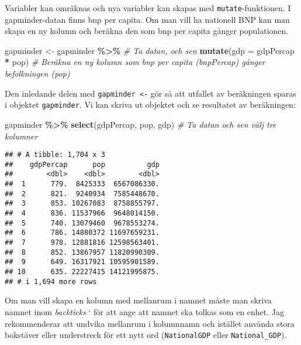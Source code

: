 \documentclass[
]{book}
\newenvironment{Shaded}{\begin{snugshade}}{\end{snugshade}}
\newcommand{\AttributeTok}[1]{\textcolor[rgb]{0.13,0.29,0.53}{#1}}
\newcommand{\CommentTok}[1]{\textcolor[rgb]{0.56,0.35,0.01}{\textit{#1}}}
\newcommand{\FunctionTok}[1]{\textcolor[rgb]{0.13,0.29,0.53}{\textbf{#1}}}
\newcommand{\NormalTok}[1]{#1}
\newcommand{\OtherTok}[1]{\textcolor[rgb]{0.56,0.35,0.01}{#1}}
\newcommand{\SpecialCharTok}[1]{\textcolor[rgb]{0.81,0.36,0.00}{\textbf{#1}}}
\theoremstyle{definition}
\theoremstyle{definition}
\theoremstyle{definition}
\theoremstyle{definition}
\theoremstyle{remark}
\begin{document}
Variabler kan omräknas och nya variabler kan skapas med \texttt{mutate}-funktionen. I gapminder-datan finns bnp per capita. Om man vill ha nationell BNP kan man skapa en ny kolumn och beräkna den som bnp per capita gånger populationen.

\begin{Shaded}
\begin{Highlighting}[]
\NormalTok{gapminder }\OtherTok{\textless{}{-}}\NormalTok{ gapminder }\SpecialCharTok{\%\textgreater{}\%}             \CommentTok{\# Ta datan, och sen}
  \FunctionTok{mutate}\NormalTok{(}\AttributeTok{gdp =}\NormalTok{ gdpPercap }\SpecialCharTok{*}\NormalTok{ pop)        }\CommentTok{\# Beräkna en ny kolumn som bnp per capita (bnpPercap) gånger befolkningen (pop)}
\end{Highlighting}
\end{Shaded}

Den inledande delen med \texttt{gapminder\ \textless{}-} gör så att utfallet av beräkningen sparas i objektet \texttt{gapminder}.
Vi kan skriva ut objektet och se resultatet av beräkningen:

\begin{Shaded}
\begin{Highlighting}[]
\NormalTok{gapminder }\SpecialCharTok{\%\textgreater{}\%} \FunctionTok{select}\NormalTok{(gdpPercap, pop, gdp)        }\CommentTok{\# Ta datan och sen välj tre kolumner}
\end{Highlighting}
\end{Shaded}

\begin{verbatim}
## # A tibble: 1,704 x 3
##    gdpPercap      pop          gdp
##        <dbl>    <dbl>        <dbl>
##  1      779.  8425333  6567086330.
##  2      821.  9240934  7585448670.
##  3      853. 10267083  8758855797.
##  4      836. 11537966  9648014150.
##  5      740. 13079460  9678553274.
##  6      786. 14880372 11697659231.
##  7      978. 12881816 12598563401.
##  8      852. 13867957 11820990309.
##  9      649. 16317921 10595901589.
## 10      635. 22227415 14121995875.
## # i 1,694 more rows
\end{verbatim}

Om man vill skapa en kolumn med mellanrum i namnet måste man skriva namnet inom \emph{backticks} ` för att ange att namnet ska tolkas som en enhet. Jag rekommenderar att undvika mellanrum i kolumnnamn och istället använda stora bokstäver eller understreck för ett nytt ord (\texttt{NationalGDP} eller \texttt{National\_GDP}).
\end{document}
